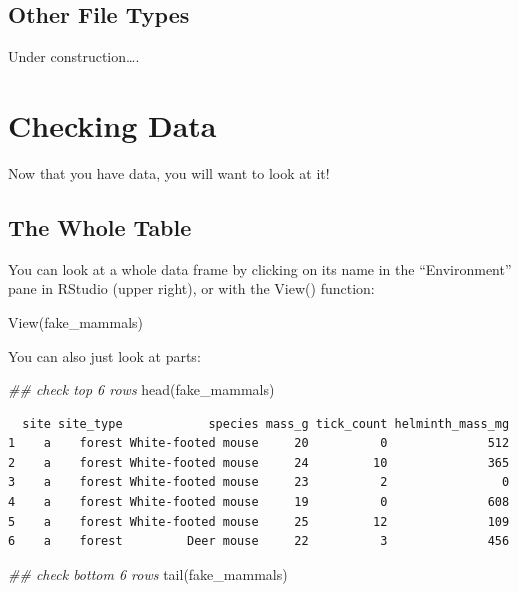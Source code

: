 \documentclass[
  letterpaper,
  DIV=11,
  numbers=noendperiod]{scrreprt}
\newenvironment{Shaded}{\begin{snugshade}}{\end{snugshade}}
\newcommand{\DocumentationTok}[1]{\textcolor[rgb]{0.37,0.37,0.37}{\textit{#1}}}
\newcommand{\FunctionTok}[1]{\textcolor[rgb]{0.28,0.35,0.67}{#1}}
\newcommand{\NormalTok}[1]{\textcolor[rgb]{0.00,0.23,0.31}{#1}}
\begin{document}
\hypertarget{other-file-types}{%
\subsection{Other File Types}\label{other-file-types}}

Under construction\ldots.

\hypertarget{checking-data}{%
\section{Checking Data}\label{checking-data}}

Now that you have data, you will want to look at it!

\hypertarget{the-whole-table}{%
\subsection{The Whole Table}\label{the-whole-table}}

You can look at a whole data frame by clicking on its name in the
``Environment'' pane in RStudio (upper right), or with the View()
function:

\begin{Shaded}
\begin{Highlighting}[]
\FunctionTok{View}\NormalTok{(fake\_mammals)}
\end{Highlighting}
\end{Shaded}

You can also just look at parts:

\begin{Shaded}
\begin{Highlighting}[]
\DocumentationTok{\#\# check top 6 rows}
\FunctionTok{head}\NormalTok{(fake\_mammals)}
\end{Highlighting}
\end{Shaded}

\begin{verbatim}
  site site_type            species mass_g tick_count helminth_mass_mg
1    a    forest White-footed mouse     20          0              512
2    a    forest White-footed mouse     24         10              365
3    a    forest White-footed mouse     23          2                0
4    a    forest White-footed mouse     19          0              608
5    a    forest White-footed mouse     25         12              109
6    a    forest         Deer mouse     22          3              456
\end{verbatim}

\begin{Shaded}
\begin{Highlighting}[]
\DocumentationTok{\#\# check bottom 6 rows}
\FunctionTok{tail}\NormalTok{(fake\_mammals)}
\end{Highlighting}
\end{Shaded}
\end{document}
